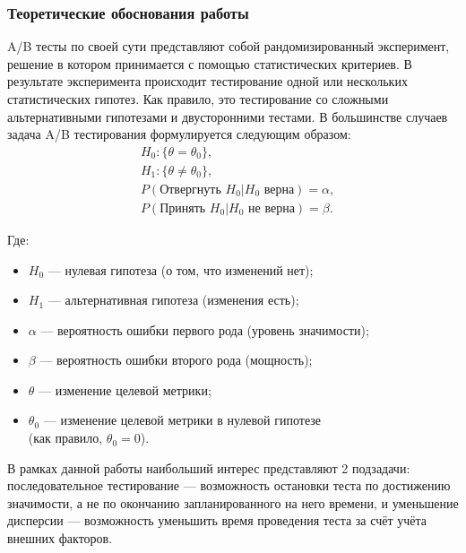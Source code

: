\documentclass[../document.tex]{subfiles}
\begin{document}
	\subsubsection{Теоретические обоснования работы}
	\par A/B тесты по своей сути представляют собой рандомизированный эксперимент, решение в котором принимается с помощью статистических критериев. В результате эксперимента происходит тестирование одной или нескольких статистических гипотез. Как правило, это тестирование со сложными альтернативными гипотезами и двусторонними тестами.
	В большинстве случаев задача A/B тестирования формулируется следующим образом:
	\begin{equation}
		\begin{aligned}
			&H_0: \{\theta = \theta_0\},\\
			&H_1: \{\theta \ne \theta_0\},\\
			&P(\text{Отвергнуть }H_0|H_0\text{ верна}) =\alpha,\\
			&P(\text{Принять }H_0|H_0\text{ не верна}) =\beta.
		\end{aligned}
	\end{equation}
	\par Где:
	\begin{itemize}
		\item $H_0$ --- нулевая гипотеза (о том, что изменений нет);
		\item $H_1$ --- альтернативная гипотеза (изменения есть);
		\item $\alpha$ --- вероятность ошибки первого рода (уровень значимости);
		\item $\beta$ --- вероятность ошибки второго рода (мощность);
		\item $\theta$ --- изменение целевой метрики;
		\item $\theta_0$ --- изменение целевой метрики в нулевой гипотезе\\ (как правило, $\theta_0 = 0$).
	\end{itemize}
	\par В рамках данной работы наибольший интерес представляют 2 подзадачи: последовательное тестирование --- возможность остановки теста по достижению значимости, а не по окончанию запланированного на него времени, и уменьшение дисперсии --- возможность уменьшить время проведения теста за счёт учёта внешних факторов.
\end{document}
